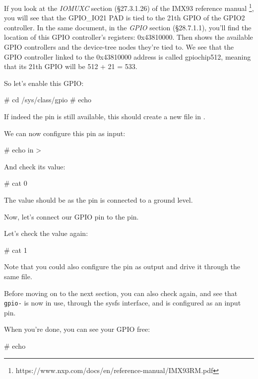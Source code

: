 If you look at the {\em IOMUXC} section (§27.3.1.26) of the IMX93 reference manual
\footnote{https://www.nxp.com/docs/en/reference-manual/IMX93RM.pdf}, you will
see that the GPIO\_IO21 PAD is tied to the 21th GPIO of the GPIO2 controller.
In the same document, in the {\em GPIO} section (§28.7.1.1), you'll find the location
of this GPIO controller's registers: 0x43810000.
Then  shows the available GPIO controllers and the
device-tree nodes they're tied to. We see that the GPIO controller linked to the
0x43810000 address is called gpiochip512, meaning that its 21th GPIO will be
512 + 21 = 533.

So let's enable this GPIO:

\begin{bashinput}
# cd /sys/class/gpio
# echo %
\end{bashinput}

If indeed the pin is still available, this should create a new
{\tt \gpioname} file in .

We can now configure this pin as input:

\begin{bashinput}
# echo in > %
\end{bashinput}

And check its value:

\begin{bashinput}
# cat %
0
\end{bashinput}

The value should be  as the pin is connected to a ground level.

Now, let's connect our GPIO pin to the  pin.

Let's check the value again:

\begin{bashinput}
# cat %
1
\end{bashinput}

Note that you could also configure the pin as output and drive it through
the same  file.

Before moving on to the next section, you can also check
 again, and see that {\tt gpio-\gpionum} is now
in use, through the sysfs interface, and is configured as an input pin.

When you're done, you can see your GPIO free:

\begin{bashinput}
# echo %
\end{bashinput}

